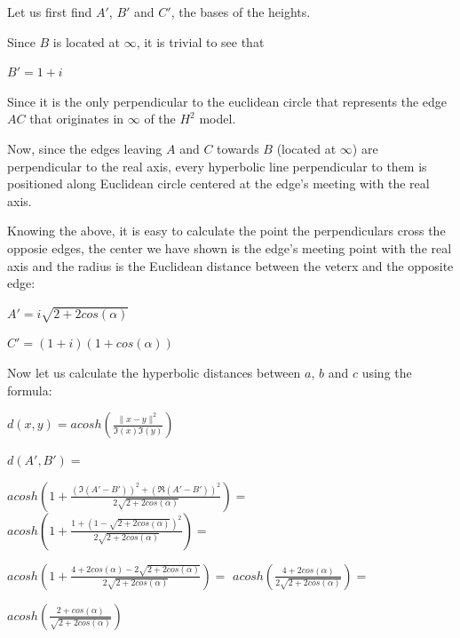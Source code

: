 \documentclass[a4paper,10pt]{article}
\begin{document}
Let us first find $A'$, $B'$ and $C'$, the bases of the heights.

Since $B$ is located at $\infty$, it is trivial to see that

\begin{center}
$B' = 1 + i$ 
\end{center}

Since it is the only perpendicular to the euclidean circle that represents the
edge $AC$ that originates in $\infty$ of the $H^2$ model.

Now, since the edges leaving $A$ and $C$ towards $B$ (located at $\infty$) are
perpendicular to the real axis, every hyperbolic line perpendicular to them
is positioned along Euclidean circle centered at the edge's meeting with the
real axis.

Knowing the above, it is easy to calculate the point the perpendiculars cross
the opposie edges, the center we have shown is the edge's meeting point with the
real axis and the radius is the Euclidean distance between the veterx and the 
opposite edge:

\begin{center}
$A' = i \sqrt{2 + 2 cos\left(\alpha\right)}$


$C' = \left(1 + i\right) \left(1 + cos\left(\alpha\right)\right)$
\end{center}


Now let us calculate the hyperbolic distances between $a$, $b$ and $c$ using the formula:

\begin{center}

$d\left(x,y\right) = acosh(\frac{\|x-y\|^{2}}{\Im\left(x\right)\Im\left(y\right)})$


\end{center}

\noindent$d\left(A', B'\right) =$

$acosh\left(1 + \frac{\left(\Im\left(A' - B'\right)\right)^{2} + \left(\Re\left(A' - B'\right)\right)^{2}}{2 \sqrt{2 + 2 cos\left(\alpha\right)}}\right) =$
$acosh\left(1 + \frac{1 + \left(1 - \sqrt{2 + 2 cos\left(\alpha\right)}\right)^{2}}{2 \sqrt{2 + 2 cos\left(\alpha\right)}}\right) =$

$acosh\left(1 + \frac{4 + 2 cos\left(\alpha\right) - 2 \sqrt{2 + 2 cos\left(\alpha\right)}}{2 \sqrt{2 + 2 cos\left(\alpha\right)}}\right) =$
$acosh\left(\frac{4 + 2 cos\left(\alpha\right)}{2 \sqrt{2 + 2 cos\left(\alpha\right)}}\right) =$

$acosh\left(\frac{2 + cos\left(\alpha\right)}{\sqrt{2 + 2 cos\left(\alpha\right)}}\right) $
\end{document}

